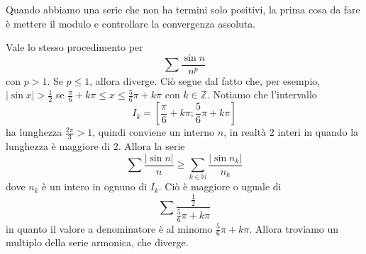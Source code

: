 \documentclass[a4paper]{article}
\begin{document}

Quando abbiamo una serie che non ha termini solo positivi, la prima cosa da fare
è mettere il modulo e controllare la convergenza assoluta.


Vale lo stesso procedimento per
\[
    \sum \frac{\sin n}{n^p}
\]
con \(p > 1\).
Se \(p \leq 1\), allora diverge. Ciò segue dal fatto che, per esempio,
\(|\sin x| > \frac{1}{2}\) se \(\frac{\pi}{6} + k\pi \leq x \leq \frac{5}{6}\pi + k\pi\)
con \(k\in\mathbb{Z}\). Notiamo che l'intervallo
\[
    I_k = \left[\frac{\pi}{6} + k\pi; \frac{5}{6}\pi + k\pi\right]
\]
ha lunghezza \(\frac{2\pi}{3} > 1\), quindi conviene un interno \(n\),
in realtà \(2\) interi in quando la lunghezza è maggiore di \(2\).
Allora la serie \[
    \sum \frac{|\sin n|}{n}
    \geq 
    \sum_{k\in\mathbb{N}} \frac{|\sin n_k|}{n_k}
\]
dove \(n_k\) è un intero in ognuno di \(I_k\).
Ciò è maggiore o uguale di
\[
    \sum \frac{\frac{1}{2}}{\frac{5}{6} \pi + k\pi}
\]
in quanto il valore a denominatore è al minomo \(\frac{5}{6} \pi + k\pi\).
Allora troviamo un multiplo della serie armonica, che diverge.
\end{document}
